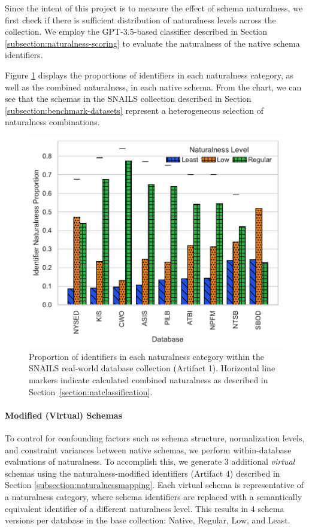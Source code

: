 Since the intent of this project is to measure the effect of schema naturalness, we first check if there is sufficient distribution of naturalness levels across the collection. 
We employ the GPT-3.5-based classifier described in Section \ref{subsection:naturalness-scoring} to evaluate the naturalness of the native schema identifiers.



Figure \ref{fig:databasenaturalness} displays the proportions of identifiers in each naturalness category, as well as the combined naturalness, in each native schema.
From the chart, we can see that the schemas in the SNAILS collection described in Section \ref{subsection:benchmark-datasets} represent a heterogeneous selection of naturalness combinations.

\begin{figure}
  \centering
  \includegraphics[width=\figwidthmod\linewidth]{figures/naturalness_by_db.pdf}
  \caption{Proportion of identifiers in each naturalness category within the SNAILS real-world database collection (Artifact 1). Horizontal line markers indicate calculated combined naturalness as described in Section~\ref{section:natclassification}.}
  \label{fig:databasenaturalness}
\end{figure}

\paragraph{\textbf{Modified (Virtual) Schemas}}
To control for confounding factors such as schema structure, normalization levels, and constraint variances between native schemas, we perform within-database evaluations of naturalness.
To accomplish this, we generate 3 additional \emph{virtual} schemas using the naturalness-modified identifiers (Artifact 4) described in Section \ref{subsection:naturalnessmapping}.
Each virtual schema is representative of a naturalness category, where schema identifiers are replaced with a semantically equivalent identifier of a different naturalness level.
This results in 4 schema versions per database in the base collection: Native, Regular, Low, and Least.

